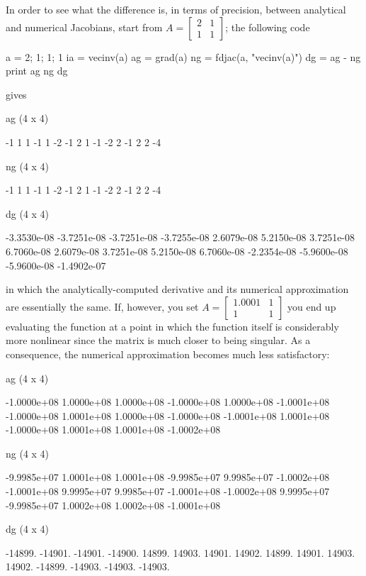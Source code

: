 In order to see what the difference is, in terms of precision, between
analytical and numerical Jacobians, start from $A =
\left[\begin{array}{cc} 2 & 1 \\ 1 & 1 \end{array}\right]$; the
following code
\begin{code}
a = {2; 1; 1; 1}
ia = vecinv(a)
ag = grad(a)
ng = fdjac(a, "vecinv(a)")
dg = ag - ng
print ag ng dg  
\end{code}
gives
\begin{code}
ag (4 x 4)

  -1    1    1   -1 
   1   -2   -1    2 
   1   -1   -2    2 
  -1    2    2   -4 

ng (4 x 4)

  -1    1    1   -1 
   1   -2   -1    2 
   1   -1   -2    2 
  -1    2    2   -4 

dg (4 x 4)

 -3.3530e-08  -3.7251e-08  -3.7251e-08  -3.7255e-08 
  2.6079e-08   5.2150e-08   3.7251e-08   6.7060e-08 
  2.6079e-08   3.7251e-08   5.2150e-08   6.7060e-08 
 -2.2354e-08  -5.9600e-08  -5.9600e-08  -1.4902e-07 
\end{code}
in which the analytically-computed derivative and its numerical
approximation are essentially the same. If, however, you set $A =
\left[\begin{array}{cc} 1.0001 & 1 \\ 1 & 1 \end{array}\right]$ you
end up evaluating the function at a point in which the function itself
is considerably more nonlinear since the matrix is much closer to
being singular. As a consequence, the numerical approximation becomes
much less satisfactory:
\begin{code}
ag (4 x 4)

 -1.0000e+08   1.0000e+08   1.0000e+08  -1.0000e+08 
  1.0000e+08  -1.0001e+08  -1.0000e+08   1.0001e+08 
  1.0000e+08  -1.0000e+08  -1.0001e+08   1.0001e+08 
 -1.0000e+08   1.0001e+08   1.0001e+08  -1.0002e+08 

ng (4 x 4)

 -9.9985e+07   1.0001e+08   1.0001e+08  -9.9985e+07 
  9.9985e+07  -1.0002e+08  -1.0001e+08   9.9995e+07 
  9.9985e+07  -1.0001e+08  -1.0002e+08   9.9995e+07 
 -9.9985e+07   1.0002e+08   1.0002e+08  -1.0001e+08 

dg (4 x 4)

     -14899.      -14901.      -14901.      -14900. 
      14899.       14903.       14901.       14902. 
      14899.       14901.       14903.       14902. 
     -14899.      -14903.      -14903.      -14903. 
\end{code}
